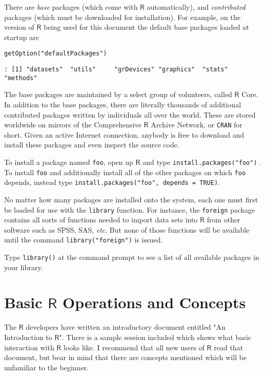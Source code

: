 There are \emph{base} packages (which come with \(\mathsf{R}\)
automatically), and \emph{contributed} packages (which must be downloaded
for installation). For example, on the version of \(\mathsf{R}\) being
used for this document the default base packages loaded at startup are

\begin{Verbatim}
getOption("defaultPackages")
\end{Verbatim}

\begin{verbatim}
: [1] "datasets"  "utils"     "grDevices" "graphics"  "stats"     "methods"
\end{verbatim}

The base packages are maintained by a select group of volunteers,
called \(\mathsf{R}\) Core. In addition to the base packages, there
are literally thousands of additional contributed packages written by
individuals all over the world. These are stored worldwide on mirrors
of the Comprehensive \(\mathsf{R}\) Archive Network, or \texttt{CRAN} for
short. Given an active Internet connection, anybody is free to
download and install these packages and even inspect the source code.

To install a package named \texttt{foo}, open up \(\mathsf{R}\) and type
\texttt{install.packages("foo")}
. To
install \texttt{foo} and additionally install all of the other packages on
which \texttt{foo} depends, instead type \texttt{install.packages("foo", depends =
TRUE)}.

No matter how many packages are installed onto the system, each one
must first be loaded for use with the
\texttt{library}  function. For instance, the
\texttt{foreign} package \cite{foreign} contains all sorts of functions
needed to import data sets into \(\mathsf{R}\) from other software
such as SPSS, SAS, \emph{etc}. But none of those functions will be
available until the command \texttt{library("foreign")} is issued.

Type \texttt{library()} at the command prompt to see a list
of all available packages in your library.

\section{Basic \(\mathsf{R}\) Operations and Concepts}
\label{sec-2-3}

The \(\mathsf{R}\) developers have written an introductory document
entitled "An Introduction to \(\mathsf{R}\)". There is a sample
session included which shows what basic interaction with
\(\mathsf{R}\) looks like. I recommend that all new users of
\(\mathsf{R}\) read that document, but bear in mind that there are
concepts mentioned which will be unfamiliar to the beginner.

